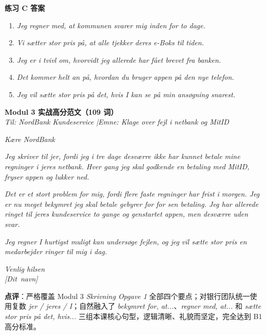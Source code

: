 \begin{answerbox}
\textbf{练习 C 答案}
\begin{enumerate}
  \item \textit{Jeg regner med, at kommunen svarer mig inden for to dage.}
  \item \textit{Vi sætter stor pris på, at alle tjekker deres e-Boks til tiden.}
  \item \textit{Jeg er i tvivl om, hvorvidt jeg allerede har fået brevet fra banken.}
  \item \textit{Det kommer helt an på, hvordan du bruger appen på den nye telefon.}
  \item \textit{Jeg vil sætte stor pris på det, hvis I kan se på min ansøgning snarest.}
\end{enumerate}

\textbf{Modul 3 实战高分范文（109 词）}\\
\textit{Til: NordBank Kundeservice \quad|\quad Emne: Klage over fejl i netbank og MitID}

\textit{Kære NordBank}

\textit{Jeg skriver til jer, fordi jeg i tre dage desværre ikke har kunnet betale mine regninger i jeres netbank. Hver gang jeg skal godkende en betaling med MitID, fryser appen og lukker ned.}

\textit{Det er et stort problem for mig, fordi flere faste regninger har frist i morgen. Jeg er nu meget bekymret  jeg skal betale gebyrer for for sen betaling. Jeg har allerede ringet til jeres kundeservice to gange og genstartet appen, men desværre uden svar.}

\textit{Jeg regner  I hurtigst muligt kan undersøge fejlen, og jeg vil sætte stor pris  en medarbejder ringer til mig i dag.}

\textit{Venlig hilsen\\
\mbox{[Dit navn]}}

\small\textbf{点评}：严格覆盖 Modul 3 \textit{Skrivning Opgave 1} 全部四个要点；对银行团队统一使用复数 \textit{jer / jeres / I}；自然融入了 \textit{bekymret for, at...}、\textit{regner med, at...} 和 \textit{sætte stor pris på det, hvis...} 三组本课核心句型，逻辑清晰、礼貌而坚定，完全达到 B1 高分标准。
\end{answerbox}